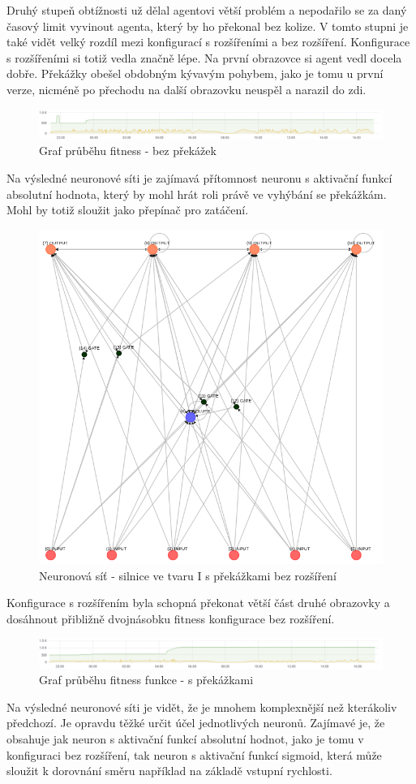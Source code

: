 Druhý stupeň obtížnosti už dělal agentovi větší problém a nepodařilo se za daný časový limit vyvinout agenta, který by ho překonal bez kolize. V tomto stupni je také vidět velký rozdíl mezi konfigurací s rozšířeními a bez rozšíření. Konfigurace s rozšířeními si totiž vedla značně lépe.
Na první obrazovce si agent vedl docela dobře. Překážky obešel obdobným kývavým pohybem, jako je tomu u první verze, nicméně po přechodu na další obrazovku neuspěl a narazil do zdi.
\begin{figure}[H]
	\centering
	\includegraphics[width=0.7\linewidth]{solutions/IWithObstructions/basicGraph}
	\caption{Graf průběhu fitness - bez překážek}
	\label{fig:obstructionsBasicgraph}
\end{figure}
Na výsledné neuronové síti je zajímavá přítomnost neuronu s aktivační funkcí absolutní hodnota, který by mohl hrát roli právě ve vyhýbání se překážkám. Mohl by totiž sloužit jako přepínač pro zatáčení.
\begin{figure}[H]
	\centering
	\includegraphics[width=0.7\linewidth]{solutions/IWithObstructions/basic}
	\caption{Neuronová síť - silnice ve tvaru I s překážkami bez rozšíření}
	\label{fig:basic}
\end{figure}
Konfigurace s rozšířením byla schopná překonat větší část druhé obrazovky a dosáhnout přibližně dvojnásobku fitness konfigurace bez rozšíření.
\begin{figure}[H]
	\centering
	\includegraphics[width=0.7\linewidth]{solutions/IWithObstructions/advancedGraph}
	\caption{Graf průběhu fitness funkce - s překážkami}
	\label{fig:advancedgraph}
\end{figure}
Na výsledné neuronové síti je vidět, že je mnohem komplexnější než kterákoliv předchozí. Je opravdu těžké určit účel jednotlivých neuronů. Zajímavé je, že obsahuje jak neuron s aktivační funkcí absolutní hodnot, jako je tomu v konfiguraci bez rozšíření, tak neuron s aktivační funkcí sigmoid, která může sloužit k dorovnání směru například na základě vstupní rychlosti.

